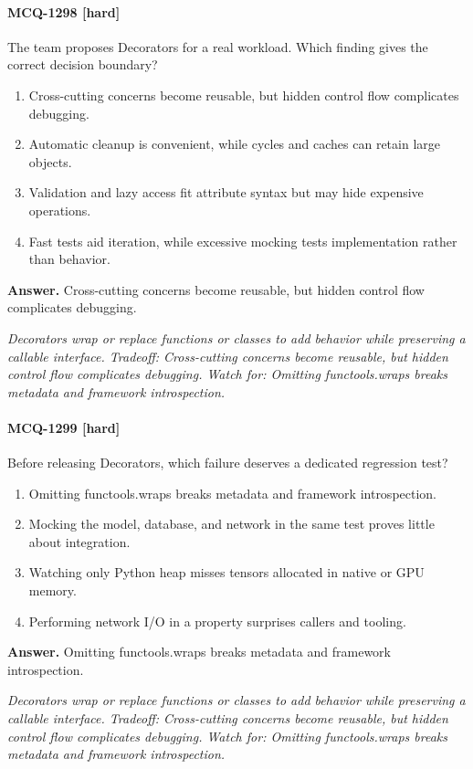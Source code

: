 \paragraph{MCQ-1298 [hard]} The team proposes Decorators for a real workload. Which finding gives the correct decision boundary?
\begin{enumerate}[label=\Alph*.]
\item Cross-cutting concerns become reusable, but hidden control flow complicates debugging.
\item Automatic cleanup is convenient, while cycles and caches can retain large objects.
\item Validation and lazy access fit attribute syntax but may hide expensive operations.
\item Fast tests aid iteration, while excessive mocking tests implementation rather than behavior.
\end{enumerate}
\noindent\textbf{Answer.} Cross-cutting concerns become reusable, but hidden control flow complicates debugging.
\par\textit{Decorators wrap or replace functions or classes to add behavior while preserving a callable interface. Tradeoff: Cross-cutting concerns become reusable, but hidden control flow complicates debugging. Watch for: Omitting functools.wraps breaks metadata and framework introspection.}
\paragraph{MCQ-1299 [hard]} Before releasing Decorators, which failure deserves a dedicated regression test?
\begin{enumerate}[label=\Alph*.]
\item Omitting functools.wraps breaks metadata and framework introspection.
\item Mocking the model, database, and network in the same test proves little about integration.
\item Watching only Python heap misses tensors allocated in native or GPU memory.
\item Performing network I/O in a property surprises callers and tooling.
\end{enumerate}
\noindent\textbf{Answer.} Omitting functools.wraps breaks metadata and framework introspection.
\par\textit{Decorators wrap or replace functions or classes to add behavior while preserving a callable interface. Tradeoff: Cross-cutting concerns become reusable, but hidden control flow complicates debugging. Watch for: Omitting functools.wraps breaks metadata and framework introspection.}

